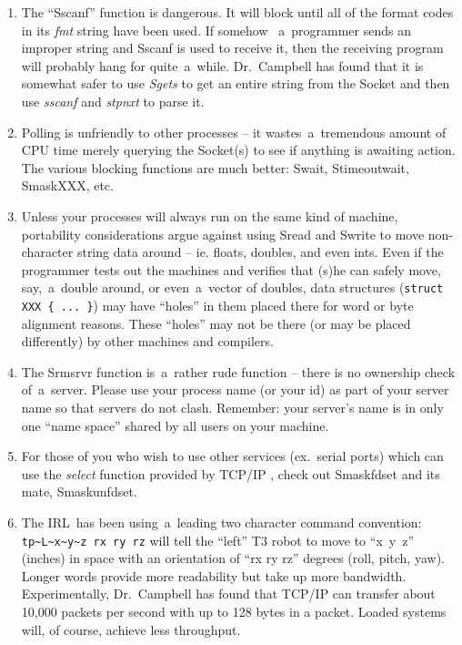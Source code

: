 \documentclass[12pt]{article}
\def\IRL{{\small IRL}}
\def\TCP{{\small TCP/IP }}
\begin{document}
\begin{enumerate}

  \item The ``Sscanf'' function is dangerous.  It will block until all of
    the format codes in its {\em fmt} string have been used.  If somehow
   ~a~programmer sends an improper string and Sscanf is used to receive it,
    then the receiving program will probably hang for quite~a~while.
    Dr.~Campbell has found that it is somewhat safer to use {\em Sgets} to
    get an entire string from the Socket and then use {\em sscanf} and
    {\em stpnxt} to parse it.

  \item Polling is unfriendly to other processes -- it wastes~a~tremendous
    amount of {\small CPU} time merely querying the Socket(s) to see if
    anything is awaiting action.  The various blocking functions are much
    better: Swait, Stimeoutwait, Smask{\small XXX}, etc.

  \item Unless your processes will always run on the same kind of machine,
    portability considerations argue against using Sread and Swrite to move
    non-character string data around -- ie. floats, doubles, and even ints.
    Even if the programmer tests out the machines and verifies that (s)he
    can safely move, say,~a~double around, or even~a~vector of doubles,
    data structures (\verb`struct XXX { ... }`) may have ``holes'' in them
    placed there for word or byte alignment reasons.  These ``holes'' may
    not be there (or may be placed differently) by other machines and compilers.

  \item The Srmsrvr function is~a~rather rude function -- there is no
    ownership check of~a~server.  Please use your process name (or your id) as
    part of your server name so that servers do not clash.  Remember: your
    server's name is in only one ``name space'' shared by all users on your
    machine.

  \item For those of you who wish to use other services (ex.~serial ports)
    which can use the {\em select} function provided by \TCP, check out Smaskfdset
    and its mate, Smaskunfdset.

  \item The \IRL\ has been using~a~leading two character command
    convention:     \verb`tp~L~x~y~z rx ry rz` will tell the ``left'' T3 robot to
    move to ``x~y~z'' (inches) in space with an orientation of ``rx ry rz''
    degrees (roll, pitch, yaw).  Longer words provide more readability but take
    up more bandwidth.  Experimentally, Dr.~Campbell has found that \TCP
    can transfer about 10,000 packets per second with up to 128 bytes in a
    packet.  Loaded systems will, of course, achieve less throughput.


\end{enumerate}
\end{document}
